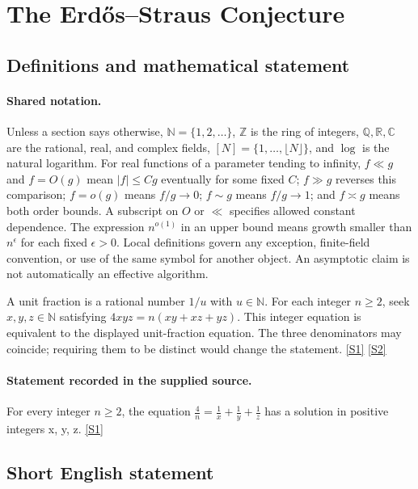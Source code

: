 \documentclass[11pt,a4paper]{article}
\newcommand{\N}{\mathbb{N}}
\newcommand{\Z}{\mathbb{Z}}
\newcommand{\Q}{\mathbb{Q}}
\newcommand{\R}{\mathbb{R}}
\newcommand{\C}{\mathbb{C}}
\newcommand{\sref}[2]{\hyperlink{source:#1:#2}{[S#2]}}
\begin{document}
\section{The Erdős--Straus Conjecture}\label{statement}


\subsection{Definitions and mathematical statement}

\paragraph{Shared notation.}Unless a section says otherwise, $\N=\{1,2,\ldots\}$,
$\Z$ is the ring of integers, $\Q,\R,\C$ are the rational, real, and complex
fields, $[N]=\{1,\ldots,\lfloor N\rfloor\}$, and $\log$ is the natural
logarithm. For real functions of a parameter tending to infinity,
$f\ll g$ and $f=O(g)$ mean $|f|\leq Cg$ eventually for some fixed $C$;
$f\gg g$ reverses this comparison; $f=o(g)$ means $f/g\to0$;
$f\sim g$ means $f/g\to1$; and $f\asymp g$ means both order bounds.
A subscript on $O$ or $\ll$ specifies allowed constant dependence.
The expression $n^{o(1)}$ in an upper bound means growth smaller than
$n^\epsilon$ for each fixed $\epsilon>0$. Local definitions govern any
exception, finite-field convention, or use of the same symbol for another
object. An asymptotic claim is not automatically an effective algorithm.



A unit fraction is a rational number $1/u$ with $u\in\N$. For each integer $n\geq2$, seek $x,y,z\in\N$ satisfying $4xyz=n(xy+xz+yz)$. This integer equation is equivalent to the displayed unit-fraction equation. The three denominators may coincide; requiring them to be distinct would change the statement. \sref{statement}{1} \sref{statement}{2}

\paragraph{Statement recorded in the supplied source.}
For every integer $n \geq 2$, the equation $\frac{4}{n} = \frac{1}{x} + \frac{1}{y} + \frac{1}{z}$ has a solution in positive integers x, y, z. \sref{statement}{1}

\subsection{Short English statement}
\end{document}
